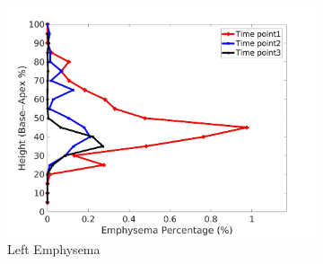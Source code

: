 \begin{figure}[H]
\begin{subfigure}{.42\linewidth}
  \includegraphics[width=\linewidth,trim={{.0\wd0} {.0\wd0} {.0\wd0} {.0\wd0}},clip]{Appendix/Image_AppexA/BaseToApex/IPF5LeftLungEmphysemaDiseaseAgainstHeight.jpg} %
  \caption{Left Emphysema}
  \label{fig:IPF5DiseaseAgainstHeight-g} 
\end{subfigure} 
\begin{subfigure}{.42\linewidth}%

\end{subfigure}
\end{figure}
